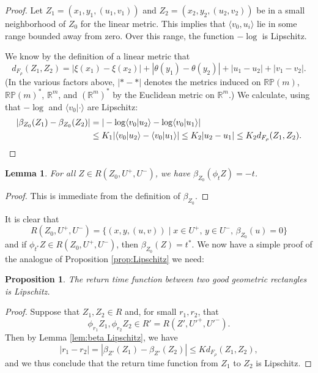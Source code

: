 \documentclass[11pt]{article}
\let\sep\mid
\newtheorem{lem}[thm]{Lemma}
\newtheorem{prop}[thm]{Proposition}
\theoremstyle{definition}
\numberwithin{equation}{section}
\begin{document}
\begin{proof}
Let $Z_1=(x_1,y_1,(u_1,v_1))$ and $Z_2=(x_2,y_2,(u_2,v_2))$ be in a small neighborhood of $Z_0$ for the linear metric. This implies that $\langle v_0,u_i\rangle$ lie in some range bounded away from zero. Over this range, the function $-\log$ is Lipschitz.

We know by the definition of a linear metric that\vspace*{-3pt}\enlargethispage{\baselineskip}%
\[ d_{F_\rho}(Z_1,Z_2) = |\xi(x_1)-\xi(x_2)| + |\theta(y_1)-\theta(y_2)| + |u_1-u_2| + |v_1-v_2|. \]
(In the various factors above, $|* - *|$ denotes the metrics induced on $\mathbb{RP}(m)$, $\mathbb{RP}(m)^*$, $\mathbb{R}^m$, and $(\mathbb{R}^m)^*$ by the Euclidean metric on $\mathbb{R}^m$.)
We calculate, using that $-\log$ and $\langle v_0 | \cdot\rangle$ are Lipschitz:\vspace*{-3pt}
\begin{align*}
|\beta_{Z_0}(Z_1)-\beta_{Z_0}(Z_2)| &= |-\log\langle v_0|u_2\rangle - \log\langle v_0|u_1\rangle |\\
& \leq K_1 |\langle v_0|u_2 \rangle - \langle v_0|u_1 \rangle| 
 \leq K_2 |u_2-u_1| \leq K_2 d_{F_\rho}(Z_1,Z_2). \qedhere
\end{align*}
\end{proof}

\begin{lem}
For all $Z\in R(Z_0,U^+,U^-)$, we have $\beta_{Z_0}(\phi_t Z) = -t$.
\end{lem}

\begin{proof}
This is immediate from the definition of $\beta_{Z_0}$.
\end{proof}

It is clear that\vspace*{-3pt}
\[
R(Z_0, U^+, U^-) = \{ (x,y,(u,v)) \sep x\in U^+,\, y\in U^-,\, \beta_{Z_0}(u)=0\}
\]
and if $\phi_{t^*}Z \in R(Z_0,U^+,U^-)$, then $\beta_{Z_0}(Z)=t^*$. We now have a simple proof of the analogue of Proposition \ref{prop:Lipschitz} we need:

\begin{prop}
The return time function between two good geometric rectangles is Lipschitz.
\end{prop}

\begin{proof}
Suppose that $Z_1, Z_2 \in R$ and, for small $r_1, r_2$, that\vspace*{-3pt}
\[
\phi_{r_1}Z_1, \phi_{r_2}Z_2 \in R'=R(Z',U'^+, U'^-).
\]
Then by Lemma \ref{lem:beta Lipschitz}, we have\vspace*{-4pt}
\[
|r_1-r_2| = |\beta_{Z'}(Z_1) - \beta_{Z'}(Z_2)| \leq K d_{F_\rho}(Z_1, Z_2),
\]
and we thus conclude that the return time function from $Z_1$ to $Z_2$ is Lipschitz.
\end{proof}
\end{document}

